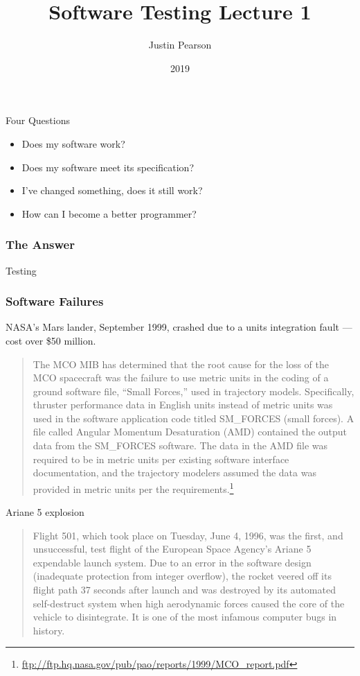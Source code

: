 \documentclass{beamer}
\title{Software Testing  Lecture 1}
\author{Justin Pearson}
\date{2019}
\begin{document}
\lstset{language=python}

\begin{frame}
  \maketitle
\end{frame}
\begin{frame}{Four Questions}
  \begin{itemize}
  \item Does my software work? \pause
  \item Does my software meet its specification? \pause
  \item I've changed something, does it still work? \pause
  \item How can I become a better programmer? 
  \end{itemize}
\end{frame}
\begin{frame}
  \frametitle{The Answer}
  \begin{center}
    {\Huge 
  Testing}
  \end{center}
\end{frame}
\begin{frame}
  \frametitle{Software Failures}

NASA's Mars lander, September 1999, crashed due to a units
    integration fault --- cost over  \$50 million.
    \begin{quote}
      The MCO MIB has determined that the root cause for the loss of
      the MCO spacecraft was the failure to use metric units in the
      coding of a ground software file, “Small Forces,” used in
      trajectory models. Specifically, thruster performance data in
      English units instead of metric units was used in the software
      application code titled SM\_FORCES (small forces). A file called
      Angular Momentum Desaturation (AMD) contained the output data
      from the SM\_FORCES software. The data in the AMD file was
      required to be in metric units per existing software interface
      documentation, and the trajectory modelers assumed the data was
      provided in metric units per the
      requirements.\footnote{\url{ftp://ftp.hq.nasa.gov/pub/pao/reports/1999/MCO_report.pdf}}
    \end{quote}  
\end{frame}
\begin{frame}{Ariane 5 explosion}
  \begin{quote}
    Flight 501, which took place on Tuesday, June 4, 1996, was the
    first, and unsuccessful, test flight of the European Space
    Agency's Ariane 5 expendable launch system. Due to an error in the
    software design (inadequate protection from integer overflow), the
    rocket veered off its flight path 37 seconds after launch and was
    destroyed by its automated self-destruct system when high
    aerodynamic forces caused the core of the vehicle to
    disintegrate. It is one of the most infamous computer bugs in
    history.
  \end{quote}
\end{frame}
\end{document}
